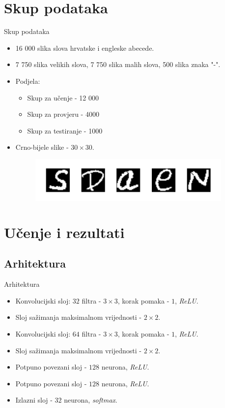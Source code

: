 \documentclass{beamer}
\begin{document}
\section{Skup podataka}
\begin{frame}{Skup podataka}
\begin{itemize}
    \item 16 000 slika slova hrvatske i engleske abecede. \pause
    \item 7 750 slika velikih slova, 7 750 slika malih slova, 500 slika znaka "-".
    \pause
    \item Podjela:
        \begin{itemize}
            \item Skup za učenje - 12 000
            \item Skup za provjeru - 4000
            \item Skup za testiranje - 1000
        \end{itemize}
        \pause
    \item Crno-bijele slike - $30 \times 30$.
    \begin{figure}[htb]
    \centering
    \includegraphics[width=10cm]{dataset_example.pdf}
    \end{figure}
\end{itemize}
\end{frame}

\section{Učenje i rezultati}
\subsection{Arhitektura}
\begin{frame}{Arhitektura}
\begin{itemize}
    \item Konvolucijski sloj: $32$ filtra - $3 \times 3$, korak pomaka - $1$, \emph{ReLU}.
    \item Sloj sažimanja maksimalnom vrijednosti -  $2 \times 2$.
    \item Konvolucijski sloj: $64$ filtra - $3 \times 3$, korak pomaka - $1$, \emph{ReLU}.
    \item Sloj sažimanja maksimalnom vrijednosti -  $2 \times 2$.
    \item Potpuno povezani sloj - $128$ neurona, \emph{ReLU}.
    \item Potpuno povezani sloj - $128$ neurona, \emph{ReLU}.
    \item Izlazni sloj - $32$ neurona, \emph{softmax}.
\end{itemize}
\end{frame}
\end{document}
